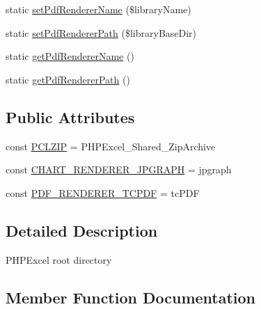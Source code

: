\begin{DoxyCompactItemize}
\item 
static \hyperlink{classPHPExcel__Settings_a40e12070e30f213706477e3d34c77a08}{set\+Pdf\+Renderer\+Name} (\$library\+Name)
\item 
static \hyperlink{classPHPExcel__Settings_a059ccb3aae84559b97ac06ceeb2ce207}{set\+Pdf\+Renderer\+Path} (\$library\+Base\+Dir)
\item 
static \hyperlink{classPHPExcel__Settings_a489ba783658916be65c853fea14f4202}{get\+Pdf\+Renderer\+Name} ()
\item 
static \hyperlink{classPHPExcel__Settings_aa92ec3129e3f2a76539dfb5209f48659}{get\+Pdf\+Renderer\+Path} ()
\end{DoxyCompactItemize}
\subsection*{Public Attributes}
\begin{DoxyCompactItemize}
\item 
const \hyperlink{classPHPExcel__Settings_a318390166ef71023bbfdc08095dab59f}{P\+C\+L\+Z\+IP} = \textquotesingle{}P\+H\+P\+Excel\+\_\+\+Shared\+\_\+\+Zip\+Archive\textquotesingle{}
\item 
const \hyperlink{classPHPExcel__Settings_ae4c1909d1fd2ef156cc33144a463e4a2}{C\+H\+A\+R\+T\+\_\+\+R\+E\+N\+D\+E\+R\+E\+R\+\_\+\+J\+P\+G\+R\+A\+PH} = \textquotesingle{}jpgraph\textquotesingle{}
\item 
const \hyperlink{classPHPExcel__Settings_a5a636a198f88ab4429560d9b8745c8ce}{P\+D\+F\+\_\+\+R\+E\+N\+D\+E\+R\+E\+R\+\_\+\+T\+C\+P\+DF} = \textquotesingle{}tc\+P\+DF\textquotesingle{}
\end{DoxyCompactItemize}


\subsection{Detailed Description}
P\+H\+P\+Excel root directory 

\subsection{Member Function Documentation}
\mbox{\label{classPHPExcel__Settings_ac77e80bd77ac4ee15c7a85444013e6fb}} 
